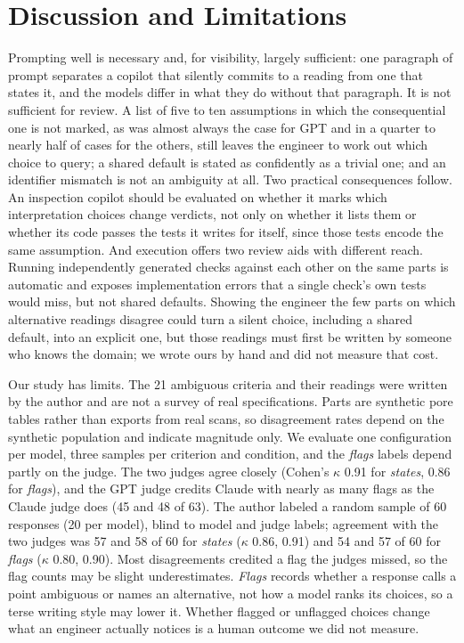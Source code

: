 \documentclass[letterpaper]{article} %
\begin{document}
\section{Discussion and Limitations}
Prompting well is necessary and, for visibility, largely sufficient: one paragraph of prompt separates a copilot that silently commits to a reading from one that states it, and the models differ in what they do without that paragraph. It is not sufficient for review. A list of five to ten assumptions in which the consequential one is not marked, as was almost always the case for GPT and in a quarter to nearly half of cases for the others, still leaves the engineer to work out which choice to query; a shared default is stated as confidently as a trivial one; and an identifier mismatch is not an ambiguity at all. Two practical consequences follow. An inspection copilot should be evaluated on whether it marks which interpretation choices change verdicts, not only on whether it lists them or whether its code passes the tests it writes for itself, since those tests encode the same assumption. And execution offers two review aids with different reach. Running independently generated checks against each other on the same parts is automatic and exposes implementation errors that a single check's own tests would miss, but not shared defaults. Showing the engineer the few parts on which alternative readings disagree could turn a silent choice, including a shared default, into an explicit one, but those readings must first be written by someone who knows the domain; we wrote ours by hand and did not measure that cost.

Our study has limits. The 21 ambiguous criteria and their readings were written by the author and are not a survey of real specifications. Parts are synthetic pore tables rather than exports from real scans, so disagreement rates depend on the synthetic population and indicate magnitude only. We evaluate one configuration per model, three samples per criterion and condition, and the \emph{flags} labels depend partly on the judge. The two judges agree closely (Cohen's $\kappa$ 0.91 for \emph{states}, 0.86 for \emph{flags}), and the GPT judge credits Claude with nearly as many flags as the Claude judge does (45 and 48 of 63). The author labeled a random sample of 60 responses (20 per model), blind to model and judge labels; agreement with the two judges was 57 and 58 of 60 for \emph{states} ($\kappa$ 0.86, 0.91) and 54 and 57 of 60 for \emph{flags} ($\kappa$ 0.80, 0.90). Most disagreements credited a flag the judges missed, so the flag counts may be slight underestimates. \emph{Flags} records whether a response calls a point ambiguous or names an alternative, not how a model ranks its choices, so a terse writing style may lower it. Whether flagged or unflagged choices change what an engineer actually notices is a human outcome we did not measure.


\end{document}
